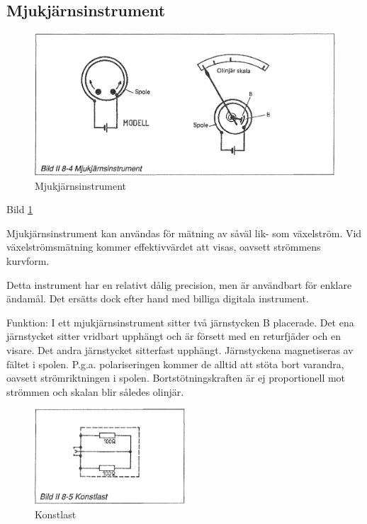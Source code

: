 \begin{rev-raderas}
\subsection{Mjukjärnsinstrument}

\begin{figure}
  \includegraphics[width=\textwidth]{images/bild_2_8-04}
  \caption{Mjukjärnsinstrument}
  \label{fig:bildII8-4}
\end{figure}

Bild \ref{fig:bildII8-4}

Mjukjärnsinstrument kan användas för mätning av såväl lik- som
växelström. Vid växelströmsmätning kommer effektivvärdet att visas,
oavsett strömmens kurvform.

Detta instrument har en relativt dålig precision, men är användbart
för enklare ändamål. Det ersätts dock efter hand med billiga digitala
instrument.

Funktion: I ett mjukjärnsinstrument sitter två järnstycken B
placerade.  Det ena järnstycket sitter vridbart upphängt och är
försett med en returfjäder och en visare.  Det andra järnstycket
sitterfast upphängt.  Järnstyckena magnetiseras av fältet i spolen.
P.g.a. polariseringen kommer de alltid att stöta bort varandra,
oavsett strömriktningen i spolen.  Bortstötningskraften är ej
proportionell mot strömmen och skalan blir således olinjär.
\end{rev-raderas}

\begin{figure}
  \includegraphics[width=0.5\textwidth]{images/bild_2_8-05}
  \caption{Konstlast}
  \label{fig:bildII8-5}
\end{figure}

